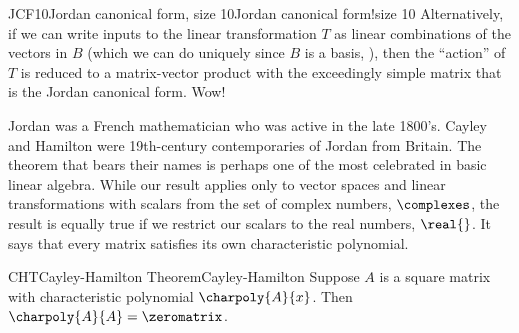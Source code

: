 \begin{example}{JCF10}{Jordan canonical form, size 10}{Jordan canonical form!size 10}
%
Alternatively, if we can write inputs to the linear transformation $T$ as linear combinations of the vectors in $B$ (which we can do uniquely since $B$ is a basis, ), then the ``action'' of $T$ is reduced to a matrix-vector product  with the exceedingly simple matrix that is the Jordan canonical form.  Wow!
%
\end{example}
%
%
%
%
Jordan was a French mathematician who was active in the late 1800's.  Cayley and Hamilton were 19th-century contemporaries of Jordan from Britain.  The theorem that bears their names is perhaps one of the most celebrated in basic linear algebra.  While our result applies only to vector spaces and linear transformations with scalars from the set of complex numbers, $\complexes$, the result is equally true if we restrict our scalars to the real numbers, $\real{\null}$.  It says that every matrix satisfies its own characteristic polynomial.
%
\begin{theorem}{CHT}{Cayley-Hamilton Theorem}{Cayley-Hamilton}
Suppose $A$ is a square matrix with characteristic polynomial $\charpoly{A}{x}$.  Then $\charpoly{A}{A}=\zeromatrix$.
\end{theorem}
%
